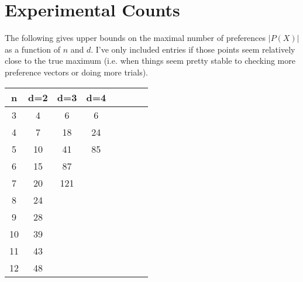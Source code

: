 \documentclass[12pt]{article}
\newcommand{\1}[1]{\mathds{1}[{#1}]}
\begin{document}

\section{Experimental Counts}
  The following gives upper bounds on the maximal number
  of preferences $|P(X)|$ as a function of $n$ and $d$.
  I've only included entries if those points seem relatively
  close to the true maximum (i.e. when things seem pretty stable
  to checking more preference vectors or doing more trials).

  \begin{tabular}{c | c c c c c c c}
    n & d=2 & d=3 & d=4 \\
    \hline
    3  &  4   & 6  & 6  \\
    4  &  7   & 18 & 24 \\
    5  &  10  & 41 & 85 \\
    6  &  15  & 87  \\
    7  &  20  & 121 \\
    8  &  24  \\
    9  &  28  \\
    10 &  39  \\
    11 &  43  \\
    12 &  48  \\
  \end{tabular}
\end{document}
